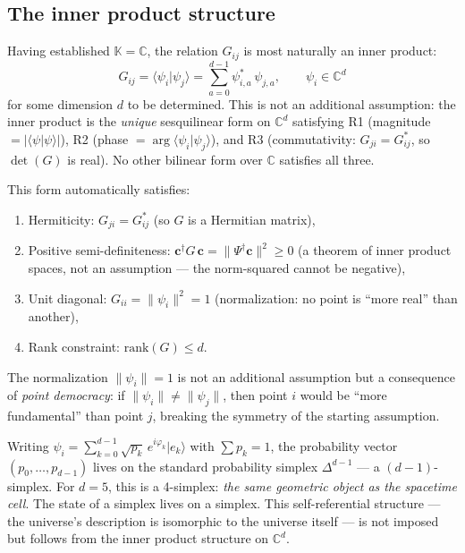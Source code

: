 \subsection{The inner product structure}

Having established $\mathbb{K} = \mathbb{C}$, the relation $G_{ij}$ is most naturally an inner product:
\begin{equation}
G_{ij} = \langle\psi_i|\psi_j\rangle = \sum_{a=0}^{d-1} \psi^*_{i,a}\,\psi_{j,a}, \qquad \psi_i \in \mathbb{C}^d
\end{equation}
for some dimension $d$ to be determined. This is not an additional assumption: the inner product is the \emph{unique} sesquilinear form on $\mathbb{C}^d$ satisfying R1 (magnitude $= |\langle\psi|\psi\rangle|$), R2 (phase $= \arg\langle\psi_i|\psi_j\rangle$), and R3 (commutativity: $G_{ji} = G_{ij}^*$, so $\det(G)$ is real). No other bilinear form over $\mathbb{C}$ satisfies all three.

This form automatically satisfies:
\begin{enumerate}
\item Hermiticity: $G_{ji} = G^*_{ij}$ (so $G$ is a Hermitian matrix),
\item Positive semi-definiteness: $\mathbf{c}^\dagger G\,\mathbf{c} = \|\Psi^\dagger\mathbf{c}\|^2 \geq 0$ (a theorem of inner product spaces, not an assumption --- the norm-squared cannot be negative),
\item Unit diagonal: $G_{ii} = \|\psi_i\|^2 = 1$ (normalization: no point is ``more real'' than another),
\item Rank constraint: $\text{rank}(G) \leq d$.
\end{enumerate}

The normalization $\|\psi_i\| = 1$ is not an additional assumption but a consequence of \emph{point democracy}: if $\|\psi_i\| \neq \|\psi_j\|$, then point $i$ would be ``more fundamental'' than point $j$, breaking the symmetry of the starting assumption.

\begin{remark}
Writing $\psi_i = \sum_{k=0}^{d-1}\sqrt{p_k}\,e^{i\varphi_k}|e_k\rangle$ with $\sum p_k = 1$, the probability vector $(p_0, \ldots, p_{d-1})$ lives on the standard probability simplex $\Delta^{d-1}$ --- a $(d{-}1)$-simplex. For $d = 5$, this is a 4-simplex: \emph{the same geometric object as the spacetime cell}. The state of a simplex lives on a simplex. This self-referential structure --- the universe's description is isomorphic to the universe itself --- is not imposed but follows from the inner product structure on $\mathbb{C}^d$.
\end{remark}

